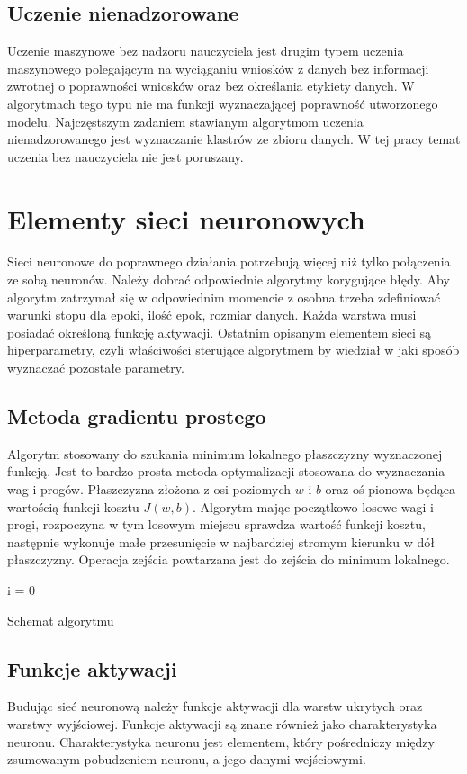 \documentclass[12pt,a4paper,twoside,titlepage,openright]{book}
\begin{document}
\subsection*{Uczenie nienadzorowane}
Uczenie maszynowe bez nadzoru nauczyciela jest drugim typem uczenia maszynowego polegającym na wyciąganiu wniosków z danych bez informacji zwrotnej o poprawności wniosków oraz bez określania etykiety danych. W algorytmach tego typu nie ma funkcji wyznaczającej poprawność utworzonego modelu. Najczęstszym zadaniem stawianym algorytmom uczenia nienadzorowanego jest wyznaczanie klastrów ze zbioru danych. W tej pracy temat uczenia bez nauczyciela nie jest poruszany.

\section{Elementy sieci neuronowych} 
Sieci neuronowe do poprawnego działania potrzebują więcej niż tylko połączenia ze sobą neuronów. Należy dobrać odpowiednie algorytmy korygujące błędy. Aby algorytm zatrzymał się w odpowiednim momencie z osobna trzeba zdefiniować warunki stopu dla epoki, ilość epok, rozmiar danych. Każda warstwa musi posiadać określoną funkcję aktywacji. Ostatnim opisanym elementem sieci są hiperparametry, czyli właściwości sterujące algorytmem by wiedział w jaki sposób wyznaczać pozostałe parametry.

\subsection{Metoda gradientu prostego}
Algorytm stosowany do szukania minimum lokalnego płaszczyzny wyznaczonej funkcją. Jest to bardzo prosta metoda optymalizacji stosowana do wyznaczania wag i progów. Płaszczyzna złożona z osi poziomych \(w\) i \(b\) oraz oś pionowa będąca wartością funkcji kosztu \(J(w,b)\). Algorytm mając początkowo losowe wagi i progi, rozpoczyna w tym losowym miejscu sprawdza wartość funkcji kosztu, następnie wykonuje małe przesunięcie w najbardziej stromym kierunku w dół płaszczyzny. Operacja zejścia powtarzana jest do zejścia do minimum lokalnego.

\begin{algorithm}
i = 0\;
\caption{Schemat algorytmu}
\end{algorithm}

\subsection{Funkcje aktywacji}
Budując sieć neuronową należy funkcje aktywacji dla warstw ukrytych oraz warstwy wyjściowej. Funkcje aktywacji są znane również jako charakterystyka neuronu. Charakterystyka neuronu jest elementem, który pośredniczy między zsumowanym pobudzeniem neuronu, a jego danymi wejściowymi. 
\end{document}
